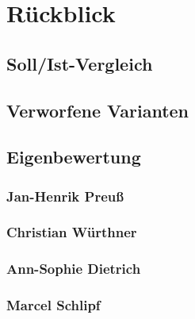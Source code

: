 \chapter{Rückblick}

\section{Soll/Ist-Vergleich}

\section{Verworfene Varianten}

\section{Eigenbewertung}

\subsection*{Jan-Henrik Preuß}

\subsection*{Christian Würthner}

\subsection*{Ann-Sophie Dietrich}

\subsection*{Marcel Schlipf}